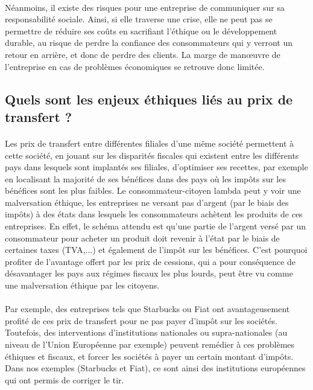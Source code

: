 \documentclass[a4paper,11pt]{article}
\theoremstyle{remark}
\begin{document}
		\paragraph{}
		Néanmoins, il existe des risques pour une entreprise de communiquer sur sa responsabilité sociale.
		Ainsi, si elle traverse une crise, elle ne peut pas se permettre de réduire ses coûts en sacrifiant l'éthique ou le développement durable, au risque de perdre la confiance des consommateurs qui y verront un retour en arrière, et donc de perdre des clients.
		La marge de manœuvre de l'entreprise en cas de problèmes économiques se retrouve donc limitée.

	\subsection{Quels sont les enjeux éthiques liés au prix de transfert ?}
	
		\paragraph{}
		Les prix de transfert entre différentes filiales d'une même société permettent à cette société, en jouant sur les disparités fiscales qui existent entre les différents pays dans lesquels sont implantés ses filiales, d'optimiser ses recettes, par exemple en localisant la majorité de ses bénéfices dans des pays où les impôts sur les bénéfices sont les plus faibles.
		Le consommateur-citoyen lambda peut y voir une malversation éthique, les entreprises ne versant pas d'argent (par le biais des impôts) à des états dans lesquels les consommateurs achètent les produits de ces entreprises.
		En effet, le schéma attendu est qu'une partie de l'argent versé par un consommateur pour acheter un produit doit revenir à l'état par le biais de certaines taxes (TVA,...) et également de l'impôt sur les bénéfices.
		C'est pourquoi profiter de l'avantage offert  par les prix de cessions, qui a pour conséquence de désavantager les pays aux régimes fiscaux les plus lourds, peut être vu comme une malversation éthique par les citoyens.

		\paragraph{}
		Par exemple, des entreprises tels que Starbucks ou Fiat ont avantageusement profité de ces prix de transfert pour ne pas payer d'impôt sur les sociétés.
		Toutefois, des interventions d'institutions nationales ou supra-nationales (au niveau de l'Union Européenne par exemple) peuvent remédier à ces problèmes éthiques et fiscaux, et forcer les sociétés à payer un certain montant d'impôts.
		Dans nos exemples (Starbucks et Fiat), ce sont ainsi des institutions européennes qui ont permis de corriger le tir.
\end{document}
